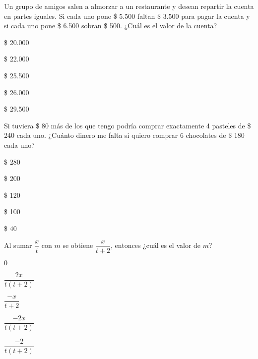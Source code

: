 \documentclass{sn-guia}
\begin{document}
\begin{problemas}
    \problema Un grupo de amigos salen a almorzar a un restaurante y desean repartir 
    la cuenta en partes iguales. Si cada uno pone \$ 5.500 faltan \$ 3.500 para 
    pagar la cuenta y si cada uno pone \$ 6.500 sobran \$ 500. ¿Cuál es el valor 
    de la cuenta?
    \begin{alternativas}
        \item \$ 20.000
        \item \$ 22.000
        \item \$ 25.500
        \item \$ 26.000
        \item \$ 29.500
    \end{alternativas}
    \problema Si tuviera \$ 80 más de los que tengo podría comprar exactamente 4 
    pasteles de \$ 240 cada uno. ¿Cuánto dinero me falta si quiero comprar 
    6 chocolates de \$ 180 cada uno?
    \begin{alternativas}
        \item \$ 280
        \item \$ 200
        \item \$ 120
        \item \$ 100
        \item \$ 40
    \end{alternativas}
    \problema Al sumar $\dfrac{x}{t}$ con $m$ se obtiene $\dfrac{x}{t+2}$, entonces ¿cuál 
    es el valor de $m$?
    \begin{alternativas}[]
        \item $0$
        \item $\dfrac{2x}{t(t+2)}$
        \item $\dfrac{-x}{t+2}$
        \item $\dfrac{-2x}{t(t+2)}$
        \item $\dfrac{-2}{t(t+2)}$
    \end{alternativas}


\end{problemas}
\end{document}
